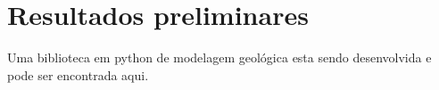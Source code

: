 \chapter{Resultados preliminares}

Uma biblioteca em python de modelagem geológica esta sendo desenvolvida e pode ser encontrada aqui.

